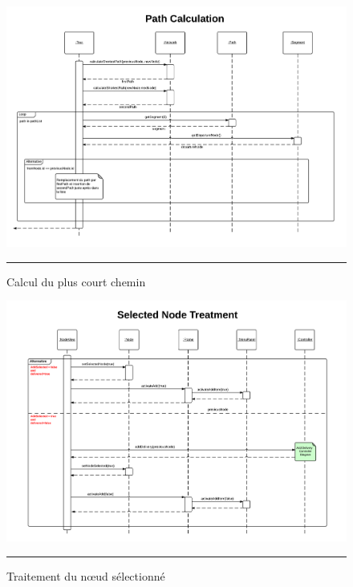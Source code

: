 \begin{figure}[H]
	\centering
		\includegraphics[width=\textwidth,height=\textheight,keepaspectratio, angle=90]{Figures/ajout_livraison6}
		\rule{35em}{0.5pt}
	\caption[Calcul du plus court chemin]{Calcul du plus court chemin}
\end{figure}

\begin{figure}[H]
	\centering
		\includegraphics[width=\textwidth,height=\textheight,keepaspectratio, angle=90]{Figures/ajout_livraison7}
		\rule{35em}{0.5pt}
	\caption[Traitement du nœud sélectionné]{Traitement du nœud sélectionné}
\end{figure}
